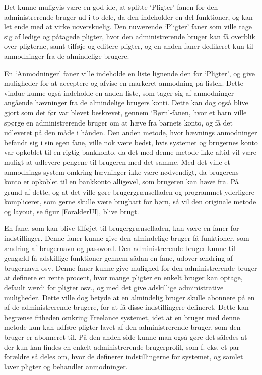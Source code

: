 Det kunne muligvis være en god ide, at splitte ‘Pligter’ fanen for den administrerende bruger ud i to dele, da den indeholder en del funktioner, og kan let ende med at virke uoverskuelig. Den nuværende ‘Pligter’ faner som ville tage sig af ledige og påtagede pligter, hvor den administrerende bruger kan få overblik over pligterne, samt tilføje og editere pligter, og en anden faner dedikeret kun til anmodninger fra de almindelige brugere.

En ‘Anmodninger’ faner ville indeholde en liste lignende den for ‘Pligter’, og give muligheder for at acceptere og afvise en markeret anmodning på listen. Dette vindue kunne også indeholde en anden liste, som tager sig af anmodninger angående hævninger fra de almindelige brugers konti. Dette kan dog også blive gjort som det før var blevet beskrevet, gennem ‘Børn’-fanen, hvor et barn ville spørge en administrerende bruger om at hæve fra barnets konto, og få det udleveret på den måde i hånden. Den anden metode, hvor hævnings anmodninger befandt sig i sin egen fane, ville nok være bedst, hvis systemet og brugernes konto var opkoblet til en rigtig bankkonto, da det med denne metode ikke altid vil være muligt at udlevere pengene til brugeren med det samme. Med det ville et anmodnings system omkring hævninger ikke være nødvendigt, da brugerens konto er opkoblet til en bankkonto alligevel, som brugeren kan hæve fra. På grund af dette, og at det ville gøre brugergrænsefladen og programmet yderligere kompliceret, som gerne skulle være brugbart for børn, så vil den originale metode og layout, se figur \ref{ForalderUI}, blive brugt.

En fane, som kan blive tilføjet til brugergrænsefladen, kan være en faner for indstillinger. Denne faner kunne give den almindelige bruger få funktioner, som ændring af brugernavn og password. Den administrerende bruger kunne til gengæld få adskillige funktioner gennem sådan en fane, udover ændring af brugernavn osv. Denne faner kunne give mulighed for den administrerende bruger at definere en rente procent, hvor mange pligter en enkelt bruger kan optage, default værdi for pligter osv., og med det give adskillige administrative muligheder. Dette ville dog betyde at en almindelig bruger skulle abonnere på en af de administrerende brugere, for at få disse indstillingere defineret. Dette kan begrænse friheden omkring Freelance systemet, idet at en bruger med denne metode kun kan udføre pligter lavet af den administrerende bruger, som den bruger er abonneret til. På den anden side kunne man også gøre det således at der kun kan findes en enkelt administrerende brugerprofil, som f. eks. et par forældre så deles om, hvor de definerer indstillingerne for systemet, og samlet laver pligter og behandler anmodninger.
